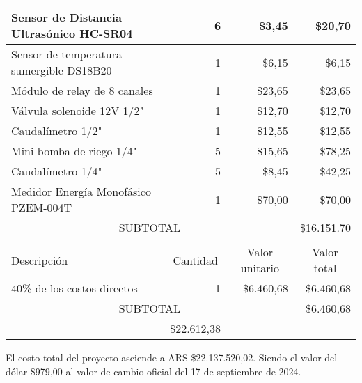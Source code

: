 \begin{table}[htpb]
\begin{tabularx}{\linewidth}{@{}|X|c|r|r|@{}}
		Sensor de Distancia Ultrasónico HC-SR04  & 
		\multicolumn{1}{r|}{6} & \multicolumn{1}{r|}{\$3,45} & \multicolumn{1}{r|}{\$20,70} \\ \hline
		Sensor de temperatura sumergible DS18B20  & 
		\multicolumn{1}{r|}{1} & \multicolumn{1}{r|}{\$6,15} & \multicolumn{1}{r|}{\$6,15} \\ \hline
		Módulo de relay de 8 canales  & 
		\multicolumn{1}{r|}{1} & \multicolumn{1}{r|}{\$23,65} & \multicolumn{1}{r|}{\$23,65} \\ \hline
		Válvula solenoide 12V 1/2"  & 
		\multicolumn{1}{r|}{1} & \multicolumn{1}{r|}{\$12,70} & \multicolumn{1}{r|}{\$12,70} \\ \hline
		Caudalímetro 1/2"  & 
		\multicolumn{1}{r|}{1} & \multicolumn{1}{r|}{\$12,55} & \multicolumn{1}{r|}{\$12,55} \\ \hline
		Mini bomba de riego 1/4"  & 
		\multicolumn{1}{r|}{5} & \multicolumn{1}{r|}{\$15,65} & \multicolumn{1}{r|}{\$78,25} \\ \hline
		Caudalímetro 1/4"  & 
		\multicolumn{1}{r|}{5} & \multicolumn{1}{r|}{\$8,45} & \multicolumn{1}{r|}{\$42,25} \\ \hline
		Medidor Energía Monofásico PZEM-004T  & 
		\multicolumn{1}{r|}{1} & \multicolumn{1}{r|}{\$70,00} & \multicolumn{1}{r|}{\$70,00} \\ \hline
		
		\multicolumn{3}{|c|}{SUBTOTAL} & \multicolumn{1}{r|}{\$16.151.70} \\ \hline
		\rowcolor[HTML]{C0C0C0}
		\multicolumn{4}{|c|}{\cellcolor[HTML]{C0C0C0}COSTOS INDIRECTOS} \\ \hline
		\rowcolor[HTML]{C0C0C0}
		Descripción                                                 &
		\multicolumn{1}{c|}{\cellcolor[HTML]{C0C0C0}Cantidad}       &
		\multicolumn{1}{c|}{\cellcolor[HTML]{C0C0C0}Valor unitario} &
		\multicolumn{1}{c|}{\cellcolor[HTML]{C0C0C0}Valor total}        \\ \hline
		40\% de los costos directos   & 
		\multicolumn{1}{r|}{1} & \multicolumn{1}{r|}{\$6.460,68} & \multicolumn{1}{r|}{\$6.460,68} \\ \hline
		
		\multicolumn{3}{|c|}{SUBTOTAL}                              &
		\multicolumn{1}{r|}{\$6.460,68}                                           \\ \hline
		\rowcolor[HTML]{C0C0C0}
		\multicolumn{3}{|c|}{TOTAL}                                 & \$22.612,38
		\\ \hline
	\end{tabularx}%
\end{table}

El costo total del proyecto asciende a ARS \$22.137.520,02. Siendo el valor del dólar \$979,00 al valor de cambio oficial del 17 de septiembre de 2024.